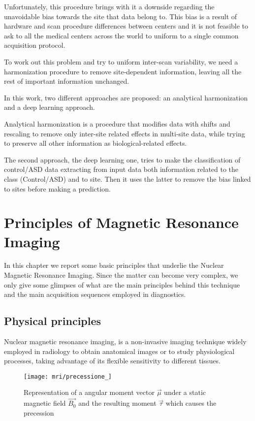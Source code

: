 \documentclass[11pt]{report}
\begin{document}
Unfortunately, this procedure brings with it a downside regarding the unavoidable bias towards the site that data belong to.
This bias is a result of hardware and scan procedure differences between centers and it is not feasible to ask to all the medical centers across the world to uniform to a single common acquisition protocol.

To work out this problem and try to uniform inter-scan variability, we need a harmonization procedure to remove site-dependent information, leaving all the rest of important information unchanged.

In this work, two different approaches are proposed: an analytical harmonization and a deep learning approach.

Analytical harmonization is a procedure that modifies data with shifts and rescaling to remove only inter-site related effects in multi-site data, while trying to preserve all other information as biological-related effects.

The second approach, the deep learning one, tries to make the classification of control/ASD data extracting from input data both information related to the class (Control/ASD) and to site.
Then it uses the latter to remove the bias linked to sites before making a prediction.


\chapter{Principles of Magnetic Resonance Imaging}\label{chap:mri_introduction}
 In this chapter we report some basic principles that underlie the Nuclear Magnetic Resonance Imaging.
 Since the matter can become very complex, we only give some glimpses of what are the main principles behind this technique and the main acquisition sequences employed in diagnostics.

\section{Physical principles}\label{sec:mri_introduction}
Nuclear magnetic resonance imaging, is a non-invasive imaging technique widely employed in radiology to obtain anatomical images or to study physiological processes, taking advantage of its flexible sensitivity to different tissues.

\begin{wrapfigure}[25]{l}{0.4\textwidth}
\centering
\texttt{[image: mri/precessione\_]}
\caption{Representation of a angular moment vector $\vec{\mu}$ under a static magnetic field $\vec{B_0}$ and the resulting moment $\vec{\tau}$  which causes the precession}
\end{wrapfigure}
\end{document}
